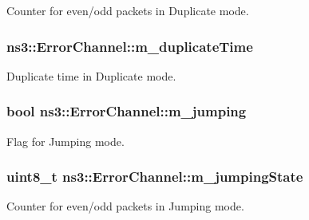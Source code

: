 Counter for even/odd packets in Duplicate mode. 

\subsubsection[{\texorpdfstring{m\+\_\+duplicate\+Time}{m_duplicateTime}}]{ ns3\+::\+Error\+Channel\+::m\+\_\+duplicate\+Time\hspace{0.3cm}{\ttfamily [private]}}\hypertarget{classns3_1_1ErrorChannel_a0130efccfb3dc20545847d7b75a3c808}{}\label{classns3_1_1ErrorChannel_a0130efccfb3dc20545847d7b75a3c808}


Duplicate time in Duplicate mode. 

\subsubsection[{\texorpdfstring{m\+\_\+jumping}{m_jumping}}]{\setlength{\rightskip}{0pt plus 5cm}bool ns3\+::\+Error\+Channel\+::m\+\_\+jumping\hspace{0.3cm}{\ttfamily [private]}}\hypertarget{classns3_1_1ErrorChannel_a49f50334e8f921caa874ebdaeaab12e9}{}\label{classns3_1_1ErrorChannel_a49f50334e8f921caa874ebdaeaab12e9}


Flag for Jumping mode. 

\subsubsection[{\texorpdfstring{m\+\_\+jumping\+State}{m_jumpingState}}]{\setlength{\rightskip}{0pt plus 5cm}uint8\+\_\+t ns3\+::\+Error\+Channel\+::m\+\_\+jumping\+State\hspace{0.3cm}{\ttfamily [private]}}\hypertarget{classns3_1_1ErrorChannel_ae90252b0fc0c7de52cf3fc738d5189e4}{}\label{classns3_1_1ErrorChannel_ae90252b0fc0c7de52cf3fc738d5189e4}


Counter for even/odd packets in Jumping mode. 

